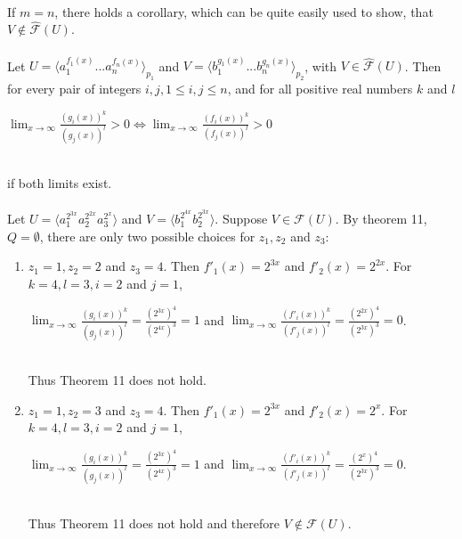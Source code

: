 \paragraph{}
If $m = n$, there holds a corollary, which can be quite easily used to show, that $V \notin \hat{\mathcal{F}}(U)$.

\paragraph{}
\cdosledok Let $U = \langle a_{1}^{f_{1}(x)}...a_{n}^{f_{n}(x)} \rangle_{p_{1}} $ and $V = \langle b_{1}^{g_{1}(x)}...b_{n}^{g_{n}(x)} \rangle_{p_{2}} $, with $V \in \hat{\mathcal{F}}(U) $. Then for every pair of integers $i, j, 1\leq i, j \leq n$, and for all positive real numbers $k$ and $l$ \\
\centerline{$\lim_{x \to \infty}\frac{(g_{i}(x))^{k}}{(g_{j}(x))^{l}} > 0 \Leftrightarrow \lim_{x \to \infty}\frac{(f_{i}(x))^{k}}{(f_{j}(x))^{l}} > 0$} \\
if both limits exist.

\paragraph{}
\priklad Let $U = \langle a_{1}^{2^{3x}}a_{2}^{2^{2x}}a_{3}^{2^{x}} \rangle $ and $V = \langle b_{1}^{2^{4x}}b_{2}^{2^{3x}} \rangle $. Suppose $V \in \mathcal{F}(U)$. By theorem 11, $Q = \emptyset $, there are only two possible choices for $z_{1}, z_{2}$ and $z_{3}$:
\begin{enumerate}
\item $z_{1} = 1, z_{2} = 2 $ and $z_{3} = 4$. Then $f'_{1}(x) = 2^{3x}$ and $f'_{2}(x) = 2^{2x}$. For $k = 4, l = 3, i = 2$ and $j = 1$,\\
\centerline{$\lim_{x \to \infty}\frac{(g_{i}(x))^{k}}{(g_{j}(x))^{l}} = \frac{(2^{3x})^{4}}{(2^{4x})^{3}} = 1$ and $\lim_{x \to \infty}\frac{(f'_{i}(x))^{k}}{(f'_{j}(x))^{l}} = \frac{(2^{2x})^{4}}{(2^{3x})^{3}} = 0$.}\\
Thus Theorem 11 does not hold.
\item $z_{1} = 1, z_{2} = 3 $ and $z_{3} = 4$. Then $f'_{1}(x) = 2^{3x}$ and $f'_{2}(x) = 2^{x}$. For $k = 4, l = 3, i = 2$ and $j = 1$,\\
\centerline{$\lim_{x \to \infty}\frac{(g_{i}(x))^{k}}{(g_{j}(x))^{l}} = \frac{(2^{3x})^{4}}{(2^{4x})^{3}} = 1$ and $\lim_{x \to \infty}\frac{(f'_{i}(x))^{k}}{(f'_{j}(x))^{l}} = \frac{(2^{x})^{4}}{(2^{3x})^{3}} = 0$.}\\
Thus Theorem 11 does not hold and therefore $V \notin \mathcal{F}(U)$.
\end{enumerate}

